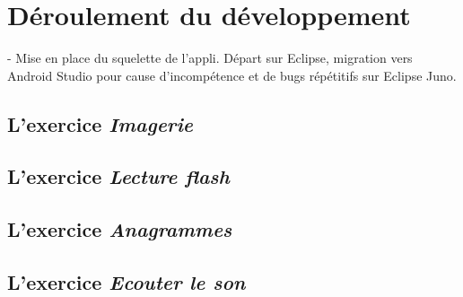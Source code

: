 \section{Déroulement du développement}
- Mise en place du squelette de l'appli. Départ sur Eclipse, migration vers Android Studio pour cause d'incompétence et de bugs répétitifs sur Eclipse Juno.

\subsection{L'exercice \textit{Imagerie}}
\subsection{L'exercice \textit{Lecture flash}}
\subsection{L'exercice \textit{Anagrammes}}
\subsection{L'exercice \textit{Ecouter le son}}
